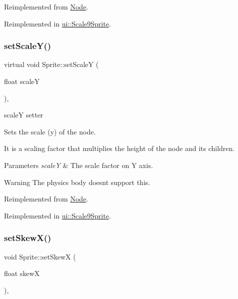 Reimplemented from \hyperlink{classNode_aec805a1fa9e8e1038556e468138bb804}{Node}.



Reimplemented in \hyperlink{classui_1_1Scale9Sprite_a7c108e20a3b0b479258447335531bfe2}{ui\+::\+Scale9\+Sprite}.

\mbox{\label{classSprite_ab7e7db21d5cd13269074fde7195fa3e2}} 
\subsubsection{\texorpdfstring{set\+Scale\+Y()}{setScaleY()}\hspace{0.1cm}{\footnotesize\ttfamily [2/2]}}
{\footnotesize\ttfamily virtual void Sprite\+::set\+ScaleY (\begin{DoxyParamCaption}\item[{float}]{scaleY }\end{DoxyParamCaption})\hspace{0.3cm}{\ttfamily [override]}, {\ttfamily [virtual]}}



scaleY setter 

Sets the scale (y) of the node.

It is a scaling factor that multiplies the height of the node and its children.


\begin{DoxyParams}{Parameters}
{\em scaleY} & The scale factor on Y axis.\\
\hline
\end{DoxyParams}
\begin{DoxyWarning}{Warning}
The physics body doesn\textquotesingle{}t support this. 
\end{DoxyWarning}


Reimplemented from \hyperlink{classNode_aec805a1fa9e8e1038556e468138bb804}{Node}.



Reimplemented in \hyperlink{classui_1_1Scale9Sprite_a7c108e20a3b0b479258447335531bfe2}{ui\+::\+Scale9\+Sprite}.

\mbox{\label{classSprite_ae6ad4d3c0f8be8d4ac45a0c1f8012896}} 
\subsubsection{\texorpdfstring{set\+Skew\+X()}{setSkewX()}\hspace{0.1cm}{\footnotesize\ttfamily [1/2]}}
{\footnotesize\ttfamily void Sprite\+::set\+SkewX (\begin{DoxyParamCaption}\item[{float}]{skewX }\end{DoxyParamCaption})\hspace{0.3cm}{\ttfamily [override]}, {\ttfamily [virtual]}}

